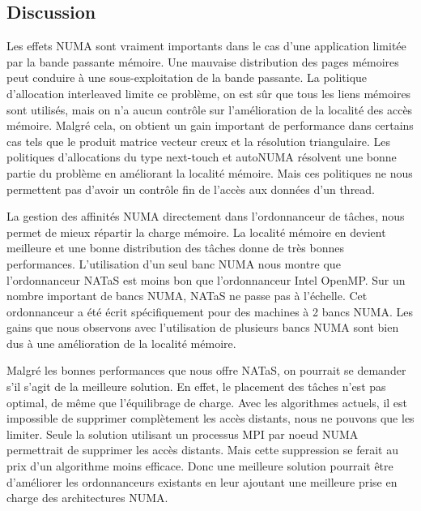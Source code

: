 \subsection{Discussion}
Les effets NUMA sont vraiment importants dans le cas d'une application limitée par la bande passante mémoire.
%
Une mauvaise distribution des pages mémoires peut conduire à une sous-exploitation de la bande passante.
%
La politique d'allocation interleaved limite ce problème, on est sûr que tous les liens mémoires sont utilisés, mais on n'a aucun contrôle sur l'amélioration de la localité des accès mémoire.
%
Malgré cela, on obtient un gain important de performance dans certains cas tels que le produit matrice vecteur creux et la résolution triangulaire.
%
Les politiques d'allocations du type next-touch et autoNUMA résolvent une bonne partie du problème en améliorant la localité mémoire.
%
Mais ces politiques ne nous permettent pas d'avoir un contrôle fin de l'accès aux données d'un thread.

La gestion des affinités NUMA directement dans l'ordonnanceur de tâches, nous permet de mieux répartir la charge mémoire.
%
La localité mémoire en devient meilleure et une bonne distribution des tâches donne de très bonnes performances.
%
L'utilisation d'un seul banc NUMA nous montre que l'ordonnanceur NATaS est moins bon que l'ordonnanceur Intel OpenMP.
%
Sur un nombre important de bancs NUMA, NATaS ne passe pas à l'échelle.
%
Cet ordonnanceur a été écrit spécifiquement pour des machines à 2 bancs NUMA.
%
Les gains que nous observons avec l'utilisation de plusieurs bancs NUMA sont bien dus à une amélioration de la localité mémoire.

Malgré les bonnes performances que nous offre NATaS, on pourrait se demander s'il s'agit de la meilleure solution.
%
En effet, le placement des tâches n'est pas optimal, de même que l'équilibrage de charge.
%
Avec les algorithmes actuels, il est impossible de supprimer complètement les accès distants, nous ne pouvons que les limiter.
%
Seule la solution utilisant un processus MPI par noeud NUMA permettrait de supprimer les accès distants.
%
Mais cette suppression se ferait au prix d'un algorithme moins efficace.
%
Donc une meilleure solution pourrait être d'améliorer les ordonnanceurs existants en leur ajoutant une meilleure prise en charge des architectures NUMA.

